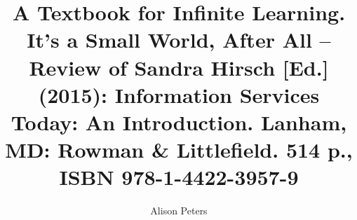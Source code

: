 
\fancyhead[R]{\thepage} %

\title{\LARGE{A Textbook for Infinite Learning. It’s a Small World, After All – Review of Sandra Hirsch [Ed.] (2015): Information Services Today: An Introduction. Lanham, MD: Rowman \& Littlefield. 514 p., ISBN 978-1-4422-3957-9}} %
\author{Alison Peters} %

\setcounter{page}{65}